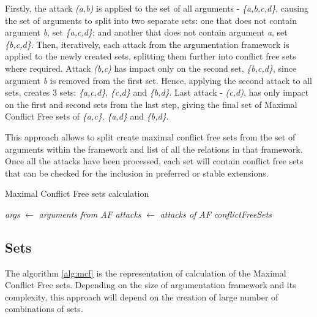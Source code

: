 Firstly, the attack \textit{(a,b)} is applied to the set of all arguments - \textit{\{a,b,c,d\}}, causing the set of arguments to split into two separate sets: one that does not contain argument \textit{b}, set \textit{\{a,c,d\}}; and another that does not contain argument \textit{a}, set \textit{\{b,c,d\}}. Then, iteratively, each attack from the argumentation framework is applied to the newly created sets, splitting them further into conflict free sets where required. Attack \textit{(b,c)} has impact only on the second set, \textit{\{b,c,d\}}, since argument \textit{b} is removed from the first set. Hence, applying the second attack to all sets, creates 3 sets: \textit{\{a,c,d\}}, \textit{\{c,d\}} and \textit{\{b,d\}}. Last attack - \textit{(c,d)}, has only impact on the first and second sets from the last step, giving the final set of Maximal Conflict Free sets of \textit{\{a,c\}}, \textit{\{a,d\}} and \textit{\{b,d\}}.

This approach allows to split create maximal conflict free sets from the set of arguments within the framework and list of all the relations in that framework. Once all the attacks have been processed, each set will contain conflict free sets that can be checked for the inclusion in preferred or stable extensions.

\begin{algorithm}
	\caption{Maximal Conflict Free sets calculation}\label{mcfPseudocode}
	\nl \textit{args} $\gets$ \textit{arguments from AF}\;
	\nl \textit{attacks} $\gets$ \textit{attacks of AF}\;
	\nl \textit{conflictFreeSets} \;
	\nl{}
	{
	}
	\label{alg:mcf}
\end{algorithm}

\subsection{Sets}

The algorithm \ref{alg:mcf} is the representation of calculation of the Maximal Conflict Free sets. Depending on the size of argumentation framework and its complexity, this approach will depend on the creation of large number of combinations of sets. 

